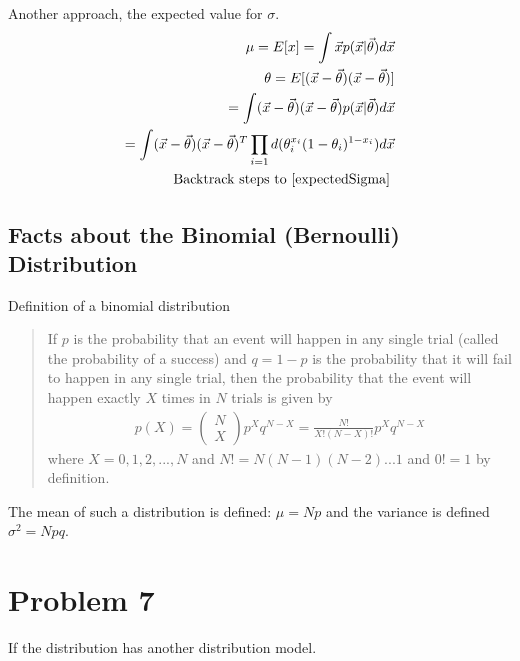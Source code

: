 \documentclass[11pt]{article}
\begin{document}
Another approach, the expected value for $\sigma$.  
\begin{eqnarray}
	\mu = E [x] = \int \vec{x} p(\vec{x} | \vec{\theta}) d\vec{x}\\
	\theta = E [(\vec{x} - \vec{\theta})(\vec{x} - \vec{\theta})]  \label{expectedSigma}\\
	= \int (\vec{x}- \vec{\theta})(\vec{x} - \vec{\theta}) p(\vec{x}| \vec{\theta}) d \vec{x} \\
	= \int (\vec{x}- \vec{\theta})(\vec{x} - \vec{\theta})^T \prod_{i=1}{d}(\theta_i ^{x_i} (1 - \theta_i) ^{1-x_i})  d \vec{x} \\
	\textrm{Backtrack steps to \ref{expectedSigma} }
\end{eqnarray}


\subsection{Facts about the Binomial (Bernoulli) Distribution} 
Definition of a binomial distribution
\begin{quote}
	If $p$ is the probability that an event will happen in any single trial (called the probability of a success) and $q= 1-p$ is the probability that it will fail to happen in any single trial, then the probability that the event will happen exactly $X$ times in $N$ trials is given by
	\begin{eqnarray}
	p(X) = 
	\left(
	\begin{array}{l}
		N \\
		X 
		\end{array}
		\right)
		p ^X q^{N-X} = \frac{N!}{X! (N-X)!} p^X q^{N-X}
	\end{eqnarray}  
	where $X=0,1,2,..., N$ and $N! = N(N-1)(N-2)...1$ and $0! = 1$ by definition.
\cite[155]{schaums-statistics}
\end{quote}
The mean of such a distribution is defined: $\mu = Np$ and the variance is defined $\sigma^2 = Npq$.

\newpage
\section{Problem 7}
If the distribution has another distribution model.  
\end{document}
